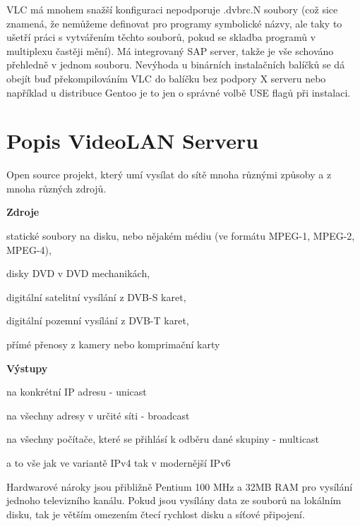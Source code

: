 VLC má mnohem snažší konfiguraci nepodporuje .dvbrc.N soubory (což sice znamená, že nemůžeme definovat pro programy symbolické názvy, ale taky to ušetří práci s vytvářením těchto souborů, pokud se skladba programů v multiplexu častěji mění). Má integrovaný SAP server, takže je vše schováno přehledně v jednom souboru. Nevýhoda u binárních instalačních balíčků se dá obejít buď překompilováním VLC do balíčku bez podpory X serveru nebo například u distribuce Gentoo je to jen o správné volbě USE flagů při instalaci.

\section{Popis VideoLAN Serveru}

Open source projekt, který umí vysílat do sítě mnoha různými způsoby a z mnoha různých zdrojů.

\vspace{10pt}

\textbf{Zdroje}

\vspace{10pt}

statické soubory na disku, nebo nějakém médiu (ve formátu MPEG-1, MPEG-2, MPEG-4),

disky DVD v DVD mechanikách,

digitální satelitní vysílání z DVB-S karet,

digitální pozemní vysílání z DVB-T karet,

přímé přenosy z kamery nebo komprimační karty

\vspace{10pt}

\textbf{Výstupy}

\vspace{10pt}

na konkrétní IP adresu - unicast

na všechny adresy v určité síti - broadcast

na všechny počítače, které se přihlásí k odběru dané skupiny - multicast

a to vše jak ve variantě IPv4 tak v modernější IPv6

\vspace{10pt}

Hardwarové nároky jsou přibližně Pentium 100 MHz a 32MB RAM pro vysílání jednoho televizního kanálu. Pokud jsou vysílány data ze souborů na lokálním disku, tak je větším omezením čtecí rychlost disku a síťové připojení.

\vspace{10pt}


